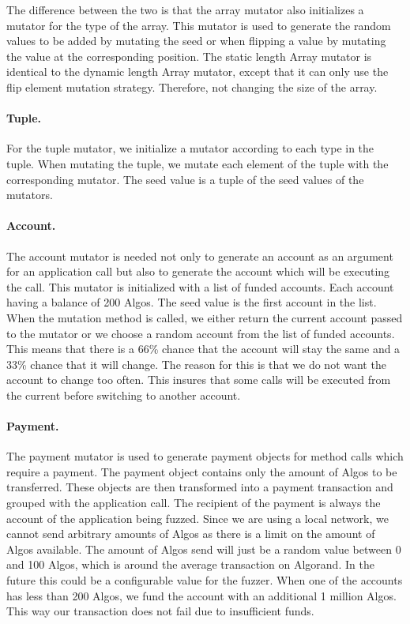 The difference between the two is that the array mutator also initializes a mutator for the type of the array.
This mutator is used to generate the random values to be added by mutating the seed or when flipping a value by mutating the value at the corresponding position.
The static length Array mutator is identical to the dynamic length Array mutator, except that it can only use the flip element mutation strategy.
Therefore, not changing the size of the array.

\paragraph{Tuple.}
For the tuple mutator, we initialize a mutator according to each type in the tuple.
When mutating the tuple, we mutate each element of the tuple with the corresponding mutator.
The seed value is a tuple of the seed values of the mutators.

\paragraph{Account.}
The account mutator is needed not only to generate an account as an argument for an application call but also to generate the account which will be executing the call.
This mutator is initialized with a list of funded accounts.
Each account having a balance of 200 Algos.
The seed value is the first account in the list.
When the mutation method is called, we either return the current account passed to the mutator or we choose a random account from the list of funded accounts.
This means that there is a 66\% chance that the account will stay the same and a 33\% chance that it will change.
The reason for this is that we do not want the account to change too often.
This insures that some calls will be executed from the current before switching to another account.

\paragraph{Payment.}
The payment mutator is used to generate payment objects for method calls which require a payment.
The payment object contains only the amount of Algos to be transferred.
These objects are then transformed into a payment transaction and grouped with the application call.
The recipient of the payment is always the account of the application being fuzzed.
Since we are using a local network, we cannot send arbitrary amounts of Algos as there is a limit on the amount of Algos available.
The amount of Algos send will just be a random value between 0 and 100 Algos, which is around the average transaction on Algorand.
In the future this could be a configurable value for the fuzzer.
When one of the accounts has less than 200 Algos, we fund the account with an additional 1 million Algos.
This way our transaction does not fail due to insufficient funds.


